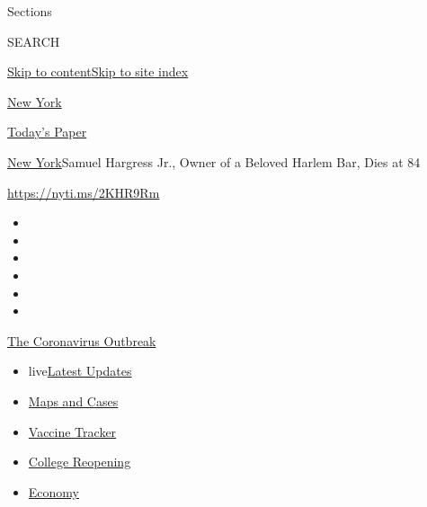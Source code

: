 Sections

SEARCH

\protect\hyperlink{site-content}{Skip to
content}\protect\hyperlink{site-index}{Skip to site index}

\href{https://www.nytimes3xbfgragh.onion/section/nyregion}{New York}

\href{https://myaccount.nytimes3xbfgragh.onion/auth/login?response_type=cookie\&client_id=vi}{}

\href{https://www.nytimes3xbfgragh.onion/section/todayspaper}{Today's
Paper}

\href{/section/nyregion}{New York}\textbar{}Samuel Hargress Jr., Owner
of a Beloved Harlem Bar, Dies at 84

\url{https://nyti.ms/2KHR9Rm}

\begin{itemize}
\item
\item
\item
\item
\item
\item
\end{itemize}

\href{https://www.nytimes3xbfgragh.onion/news-event/coronavirus?action=click\&pgtype=Article\&state=default\&region=TOP_BANNER\&context=storylines_menu}{The
Coronavirus Outbreak}

\begin{itemize}
\tightlist
\item
  live\href{https://www.nytimes3xbfgragh.onion/2020/08/04/world/coronavirus-covid-19.html?action=click\&pgtype=Article\&state=default\&region=TOP_BANNER\&context=storylines_menu}{Latest
  Updates}
\item
  \href{https://www.nytimes3xbfgragh.onion/interactive/2020/us/coronavirus-us-cases.html?action=click\&pgtype=Article\&state=default\&region=TOP_BANNER\&context=storylines_menu}{Maps
  and Cases}
\item
  \href{https://www.nytimes3xbfgragh.onion/interactive/2020/science/coronavirus-vaccine-tracker.html?action=click\&pgtype=Article\&state=default\&region=TOP_BANNER\&context=storylines_menu}{Vaccine
  Tracker}
\item
  \href{https://www.nytimes3xbfgragh.onion/2020/08/02/us/covid-college-reopening.html?action=click\&pgtype=Article\&state=default\&region=TOP_BANNER\&context=storylines_menu}{College
  Reopening}
\item
  \href{https://www.nytimes3xbfgragh.onion/live/2020/08/03/business/stock-market-today-coronavirus?action=click\&pgtype=Article\&state=default\&region=TOP_BANNER\&context=storylines_menu}{Economy}
\end{itemize}

